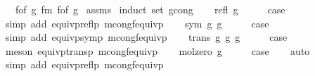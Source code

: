 \begin{isabellebody}
\ \ \ {\isachardoublequoteopen}f{\isacharunderscore}{\kern0pt}of\ g{}\ {\isasymsimeq}fm\ f{\isacharunderscore}{\kern0pt}of\ g{}{\isachardoublequoteclose}\isanewline
%
\isadelimproof
%
\endisadelimproof
%
\isatagproof
{}\isamarkupfalse%
\ assms\isanewline
{}\isamarkupfalse%
\ {\isacharparenleft}{\kern0pt}induct\ set{\isacharcolon}{\kern0pt}\ gcong{\isacharparenright}{\kern0pt}\isanewline
\ \ \isamarkupfalse%
\ {\isacharparenleft}{\kern0pt}refl\ g{\isacharparenright}{\kern0pt}\isanewline
\ \ \isamarkupfalse%
\ \isamarkupfalse%
\ {\isacharquery}{\kern0pt}case\isanewline
\ \ \isamarkupfalse%
\ {\isacharparenleft}{\kern0pt}simp\ add{\isacharcolon}{\kern0pt}\ equivp{\isacharunderscore}{\kern0pt}reflp\ mcong{\isacharunderscore}{\kern0pt}f{\isacharunderscore}{\kern0pt}equivp{\isacharparenright}{\kern0pt}\isanewline
{}\isamarkupfalse%
\isanewline
\ \ \isamarkupfalse%
\ {\isacharparenleft}{\kern0pt}sym\ g{}\ g{}{\isacharparenright}{\kern0pt}\isanewline
\ \ \isamarkupfalse%
\ \isamarkupfalse%
\ {\isacharquery}{\kern0pt}case\isanewline
\ \ \isamarkupfalse%
\ {\isacharparenleft}{\kern0pt}simp\ add{\isacharcolon}{\kern0pt}\ equivp{\isacharunderscore}{\kern0pt}symp\ mcong{\isacharunderscore}{\kern0pt}f{\isacharunderscore}{\kern0pt}equivp{\isacharparenright}{\kern0pt}\isanewline
{}\isamarkupfalse%
\isanewline
\ \ \isamarkupfalse%
\ {\isacharparenleft}{\kern0pt}trans\ g{}\ g{}\ g{}{\isacharparenright}{\kern0pt}\isanewline
\ \ \isamarkupfalse%
\ \isamarkupfalse%
\ {\isacharquery}{\kern0pt}case\isanewline
\ \ \isamarkupfalse%
\ {\isacharparenleft}{\kern0pt}meson\ equivp{\isacharunderscore}{\kern0pt}transp\ mcong{\isacharunderscore}{\kern0pt}f{\isacharunderscore}{\kern0pt}equivp{\isacharparenright}{\kern0pt}\isanewline
{}\isamarkupfalse%
\isanewline
\ \ \isamarkupfalse%
\ {\isacharparenleft}{\kern0pt}mol{\isacharunderscore}{\kern0pt}zero\ g{\isacharparenright}{\kern0pt}\isanewline
\ \ \isamarkupfalse%
\ \isamarkupfalse%
\ {\isacharquery}{\kern0pt}case\isanewline
\ \ \isamarkupfalse%
\ auto\isanewline
\ \ \isamarkupfalse%
\ {\isacharparenleft}{\kern0pt}simp\ add{\isacharcolon}{\kern0pt}\ equivp{\isacharunderscore}{\kern0pt}reflp\ mcong{\isacharunderscore}{\kern0pt}f{\isacharunderscore}{\kern0pt}equivp{\isacharparenright}{\kern0pt}\isanewline

\end{isabellebody}

